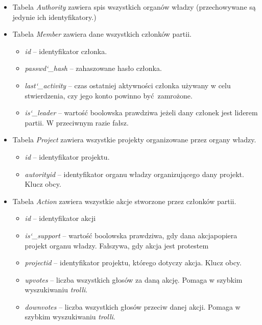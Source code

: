 \documentclass[12pt]{article}
\begin{document}
\begin{itemize}
    \item{Tabela \textit{Authority} zawiera spis wszystkich organów władzy
          (przechowywane są jedynie ich identyfikatory.)}
    \item{Tabela \textit{Member} zawiera dane wszystkich członków partii.}
    \begin{itemize}
        \item{\textit{id} -- identyfikator członka.}
        \item{\textit{passwd\char`_hash} -- zahaszowane hasło członka.}
        \item{\textit{last\char`_activity} -- czas ostatniej aktywności członka
              używany w celu stwierdzenia, czy jego konto powinno być zamrożone.}
        \item{\textit{is\char`_leader} -- wartość boolowska prawdziwa jeżeli
              dany członek jest liderem partii. W przeciwnym razie fałsz.}
    \end{itemize}
    \item{Tabela \textit{Project} zawiera wszystkie projekty organizowane
          przez organy władzy.}
    \begin{itemize}
        \item{\textit{id} -- identyfikator projektu.}
        \item{\textit{autorityid} -- identyfikator organu władzy organizującego
              dany projekt. Klucz obcy.}
    \end{itemize}
    \item{Tabela \textit{Action} zawiera wszystkie akcje stworzone przez członków
          partii.}
    \begin{itemize}
        \item{\textit{id} -- identyfikator akcji}
        \item{\textit{is\char`_support} -- wartość boolowska prawdziwa, 
              gdy dana akcjapopiera projekt organu władzy. 
              Fałszywa, gdy akcja jest protestem}
        \item{\textit{projectid} -- identyfikator projektu, którego dotyczy 
              akcja. Klucz obcy.}
        \item{\textit{upvotes} -- liczba wszystkich głosów za daną akcję. Pomaga
              w szybkim wyszukiwaniu \textit{trolli}.}
        \item{\textit{downvotes} -- liczba wszystkich głosów przeciw danej akcji. 
              Pomaga w szybkim wyszukiwaniu \textit{trolli}.}

\end{itemize}
\end{itemize}
\end{document}
